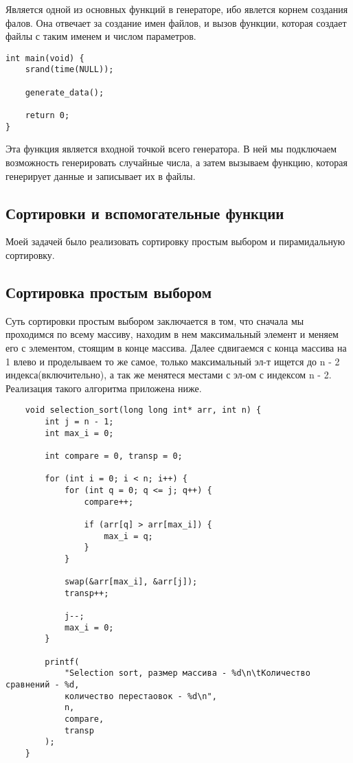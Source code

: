 \documentclass[a4paper,12pt,titlepage,finall]{article}
\begin{document}
Является одной из основных функций в генераторе, ибо явлется корнем создания фалов.
Она отвечает за создание имен файлов, и вызов функции, которая создает файлы с таким именем и числом параметров.

\begin{verbatim}
int main(void) {
    srand(time(NULL));

    generate_data();

    return 0;
}
\end{verbatim}

Эта функция является входной точкой всего генератора.
В ней мы подключаем возможность генерировать случайные числа,
а затем вызываем функцию, которая генерирует данные и записывает их в файлы.

\newpage

\subsection{Сортировки и вспомогательные функции}

Моей задачей было реализовать сортировку простым выбором и пирамидальную сортировку.

\subsection{Сортировка простым выбором}

Суть сортировки простым выбором заключается в том, что сначала мы проходимся по всему массиву, находим
в нем максимальный элемент и меняем его с элементом, стоящим в конце массива. Далее сдвигаемся с конца массива на 1 влево
и проделываем то же самое, только максимальный эл-т ищется до n - 2 индекса(включительно),
а так же менятеся местами с эл-ом с индексом n - 2. Реализация такого алгоритма приложена ниже.

\begin{verbatim}
    void selection_sort(long long int* arr, int n) {
        int j = n - 1;
        int max_i = 0;

        int compare = 0, transp = 0;

        for (int i = 0; i < n; i++) {
            for (int q = 0; q <= j; q++) {
                compare++;

                if (arr[q] > arr[max_i]) {
                    max_i = q;  
                }
            }

            swap(&arr[max_i], &arr[j]);
            transp++;

            j--;
            max_i = 0;
        }

        printf(
            "Selection sort, размер массива - %d\n\tКоличество сравнений - %d,
            количество перестаовок - %d\n",
            n,
            compare,
            transp
        );
    }
\end{verbatim}
\end{document}
